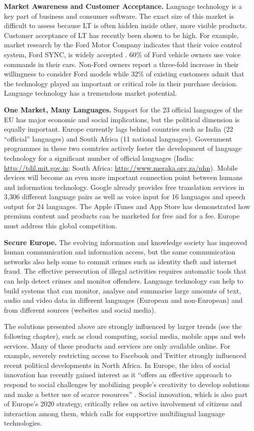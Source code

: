 \documentclass[10pt, plain]{../../metanetpaper}
\begin{document}
\begin{multicols}{2}
\textbf{Market Awareness and Customer Acceptance.} Language technology is a key part of business and consumer software. The exact size of this market is difficult to assess because LT is often hidden inside other, more visible products. Customer acceptance of LT has recently been shown to be high. For example, market research by the Ford Motor Company indicates that their voice control system, Ford SYNC, is widely accepted \cite{ford}. 60\% of Ford vehicle owners use voice commands in their cars. Non-Ford owners report a three-fold increase in their willingness to consider Ford models while 32\% of existing customers admit that the technology played an important or critical role in their purchase decision. Language technology has a tremendous market potential.

\textbf{One Market, Many Languages.} Support for the 23 official languages of the EU has major economic and social implications, but the political dimension is equally important. Europe currently lags behind countries such as India (22 “official” languages) and South Africa (11 national languages). Government programmes in these two countries actively foster the development of language technology for a significant number of official languages (India: \url{http://tdil.mit.gov.in}; South Africa: \url{http://www.meraka.org.za/nhn}). Mobile devices will become an even more important connection point between humans and information technology. Google already provides free translation services in 3,306 different language pairs as well as voice input for 16 languages and speech output for 24 languages. The Apple iTunes and App Store has demonstrated how premium content and products can be marketed for free and for a fee. Europe must address this global competition.

\textbf{Secure Europe.} The evolving information and knowledge society has improved human communication and information access, but the same communication networks also help some to commit crimes such as identity theft and internet fraud. The effective persecution of illegal activities requires automatic tools that can help detect crimes and monitor offenders. Language technology can help to build systems that can monitor, analyse and summarise large amounts of text, audio and video data in different languages (European and non-European) and from different sources (websites and social media).

The solutions presented above are strongly influenced by larger trends (see the following chapter), such as cloud computing, social media, mobile apps and web services. Many of these products and services are only available online. For example, severely restricting access to Facebook and Twitter strongly influenced recent political developments in North Africa. In Europe, the idea of social innovation has recently gained interest as it “offers an effective approach to respond to social challenges by mobilizing people's creativity to develop solutions and make a better use of scarce resources” \cite{EC5}. Social innovation, which is also part of Europe’s 2020 strategy, critically relies on active involvement of citizens and interaction among them, which calls for supportive multilingual language technologies.


\end{multicols}
\end{document}
